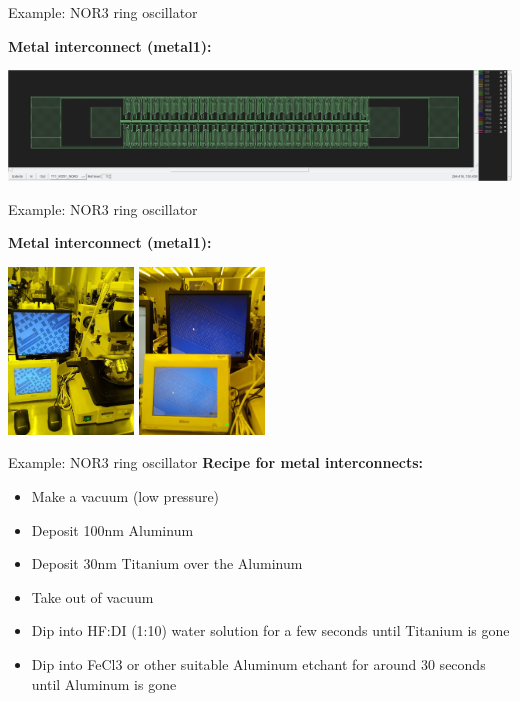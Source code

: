 \documentclass[aspectratio=169]{beamer}
\begin{document}
\begin{frame}{Example: NOR3 ring oscillator}
\begin{center}
	\textbf{Metal interconnect (metal1):}

	\includegraphics[width=\textwidth]{images/Screenshot_20181219_184526.png}
\end{center}
\end{frame}

\begin{frame}{Example: NOR3 ring oscillator}
\begin{center}
	\textbf{Metal interconnect (metal1):}

	\includegraphics[width=0.25\textwidth]{images/20181218_115931.jpg}
	\includegraphics[width=0.25\textwidth]{images/20181218_161016.jpg}
\end{center}
\end{frame}

\begin{frame}{Example: NOR3 ring oscillator}
	\textbf{Recipe for metal interconnects:}

	\begin{itemize}
		\item Make a vacuum (low pressure)
		\item Deposit 100nm Aluminum
		\item Deposit 30nm Titanium over the Aluminum
		\item Take out of vacuum
		\item Dip into HF:DI (1:10) water solution for a few seconds until Titanium is gone
		\item Dip into FeCl3 or other suitable Aluminum etchant for around 30 seconds until Aluminum is gone
	\end{itemize}
	
\end{frame}
\end{document}
